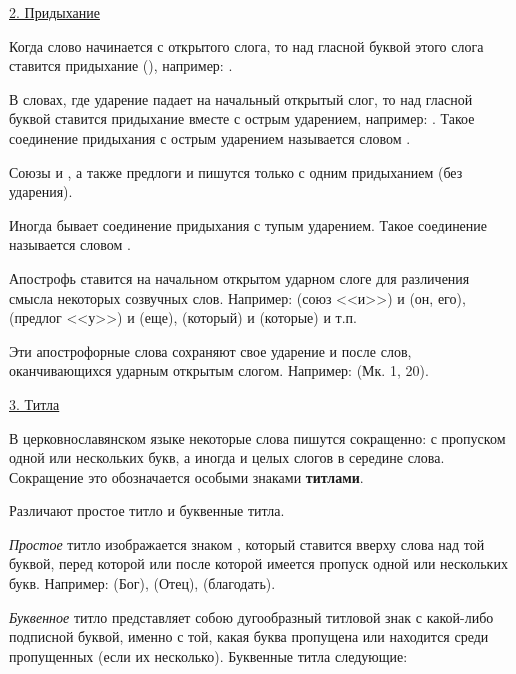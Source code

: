 \documentclass[11pt,a4paper,oneside]{memoir}
\begin{document}
    \medskip
    \underline{2. Придыхание}
    \medskip
    
    Когда слово начинается с открытого слога, то над гласной буквой этого слога ставится придыхание ({}), например: {}.
    
    В словах, где ударение падает на начальный открытый слог, то над гласной буквой ставится придыхание вместе с острым ударением, например: {}. Такое соединение придыхания с острым ударением называется словом {}.
    
    Союзы {} и {}, а также предлоги {} и {} пишутся только с одним придыханием (без ударения).
    
    Иногда бывает соединение придыхания с тупым ударением. Такое соединение называется словом {}.
    
    Апострофь ставится на начальном открытом ударном слоге для различения смысла некоторых созвучных слов. Например: {} (союз <<и>>) и {} (он, его), {} (предлог <<у>>) и {} (еще), {} (который) и {} (которые) и т.п.

    Эти апострофорные слова сохраняют свое ударение и после слов, оканчивающихся ударным открытым слогом. Например: {} (Мк. 1, 20).
    
    \medskip
    \underline{3. Титла}
    \medskip
    
    В церковнославянском языке некоторые слова пишутся сокращенно: с пропуском одной или нескольких букв, а иногда и целых слогов в середине слова. Сокращение это обозначается особыми знаками \textbf{титлами}.
    
    Различают простое титло и буквенные титла.
    
    \emph{Простое} титло изображается знаком {}, который ставится вверху слова над той буквой, перед которой или после которой имеется пропуск одной или нескольких букв. Например: {} (Бог), {} (Отец), {} (благодать).
    
    \emph{Буквенное} титло представляет собою дугообразный титловой знак {} с какой-либо подписной буквой, именно с той, какая буква пропущена или находится среди пропущенных (если их несколько). Буквенные титла следующие:

    \bigskip{}
\end{document}

